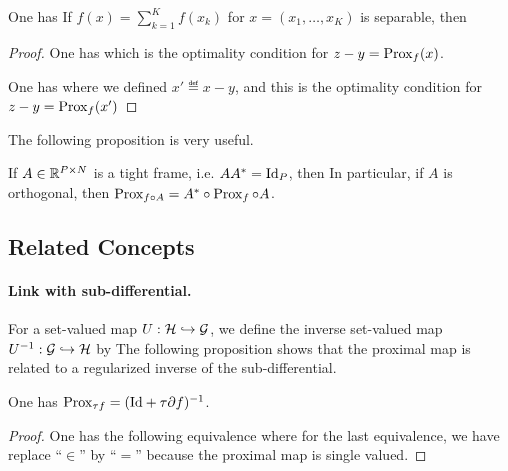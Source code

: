\begin{prop}
One has
If $f(x)=\sum_{k=1}^K f(x_k)$ for $x=(x_1,\ldots,x_K)$ is separable, then
\end{prop}
\begin{proof}
	One has
	which is the optimality condition for $z-y = \operatorname{Prox}_{f}(x)$.
	
	
	One has
	where we defined $x' \eqdef x-y$, and this is the optimality condition for $z-y = \operatorname{Prox}_{f}(x')$
\end{proof}

The following proposition is very useful.

\begin{prop}\label{prop-prox-tightframe}
	If $A \in \mathbb{R}^{P \times N}$ is a tight frame, i.e. $AA^*=\mathrm{Id}_P$, then 
	In particular, if $A$ is orthogonal, then $\operatorname{Prox}_{f \circ A} = A^* \circ \operatorname{Prox}_{f} \circ A$.
\end{prop}


\subsection{Related Concepts}

\paragraph{Link with sub-differential.}

For a set-valued map $U : \mathcal{H} \hookrightarrow \mathcal{G}$, we define the inverse set-valued map $U^{-1} : \mathcal{G} \hookrightarrow \mathcal{H}$ by 
The following proposition shows that the proximal map is related to a regularized inverse of the sub-differential.


\begin{prop}
	One has $\operatorname{Prox}_{\tau f} = (\mathrm{Id}+\tau\partial f)^{-1}$.
\end{prop}
\begin{proof}
One has the following equivalence
where for the last equivalence, we have replace ``$\in$'' by ``$=$'' because the proximal map is single valued.
\end{proof}

